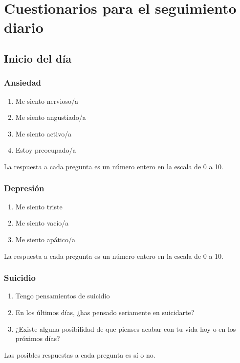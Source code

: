 \chapter{Cuestionarios para el seguimiento diario}
\label{chapter:cuestionarios}
    \section{Inicio del día}
        \subsection{Ansiedad}
            \begin{enumerate}
                \item Me siento nervioso/a
                \item Me siento angustiado/a
                \item Me siento activo/a
                \item Estoy preocupado/a
            \end{enumerate}
            La respuesta a cada pregunta es un número entero en la escala de 0 a 10.

        \subsection{Depresión}
            \begin{enumerate}
                \item Me siento triste
                \item Me siento vacío/a 
                \item Me siento apático/a
            \end{enumerate}
            La respuesta a cada pregunta es un número entero en la escala de 0 a 10.

        \subsection{Suicidio}
            \begin{enumerate}
                \item Tengo pensamientos de suicidio
                \item En los últimos días, ¿has pensado seriamente en suicidarte?
                \item ¿Existe alguna posibilidad de que pienses acabar con tu vida hoy o en los próximos días?
            \end{enumerate}
            Las posibles respuestas a cada pregunta es sí o no.

